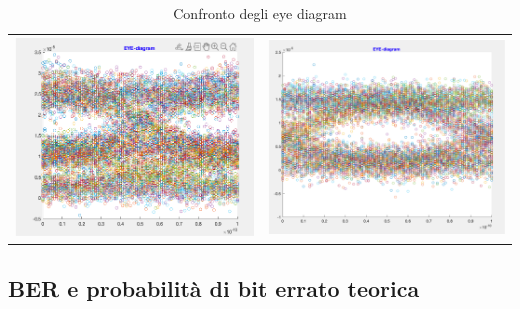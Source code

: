\documentclass[12pt, a4paper]{article}
\begin{document}
\begin{table}[h!]
\begin{tabular}{ll}
    \includegraphics[scale = 0.7]{OFF90.png}   &              \includegraphics[scale = 0.73]{ON90.png}               
\end{tabular}
\caption{\label{tab:eye}Confronto degli eye diagram}
\end{table}


\newpage
\subsection{BER e probabilità di bit errato teorica}
\label{sub:ber}
\end{document}
